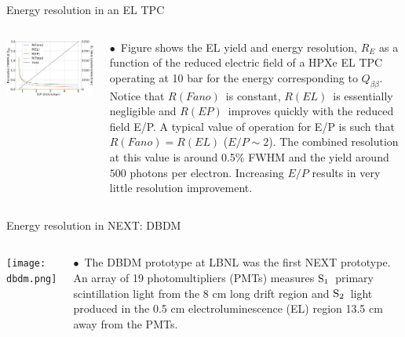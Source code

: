 \documentclass [aspectratio=169]{beamer}
\newcommand{\qbb}{\ensuremath{Q_{\beta\beta}}}
\newcommand{\so}{\ensuremath{\rm S_1}}
\newcommand{\st}{\ensuremath{\rm S_2}}
\begin{document}
\begin{frame}{Energy resolution in an EL TPC}
\begin{columns}
\includegraphics[scale=0.20]{resolution_15_bar.png}


$\bullet$~Figure shows the EL yield and energy resolution, $R_E$ as a function of the reduced electric field of a HPXe EL TPC operating at 10 bar for the energy corresponding to \qbb. Notice that $R(Fano)$~is constant, $R(EL)$~is essentially negligible and $R(EP)$~improves quickly with the reduced field E/P. A typical value of operation for
E/P is such that $R(Fano) = R(EL)$ ($E/P \sim 2$). The combined resolution at this value
is around 0.5\% FWHM and the yield around $500$ photons per electron. Increasing $E/P$ results in very little resolution improvement.
\end{columns}
\end{frame}


\begin{frame}{Energy resolution in NEXT: DBDM}
\begin{columns}
\texttt{[image: dbdm.png]}


$\bullet$~The DBDM prototype at LBNL was the first NEXT prototype.  An array of 19
photomultipliers (PMTs) measures \so\ primary scintillation light from the 8 cm long drift
region and \st\ light produced in the 0.5 cm electroluminescence (EL) region 13.5 cm away
from the PMTs. 
\end{columns}
\end{frame}
\end{document}

